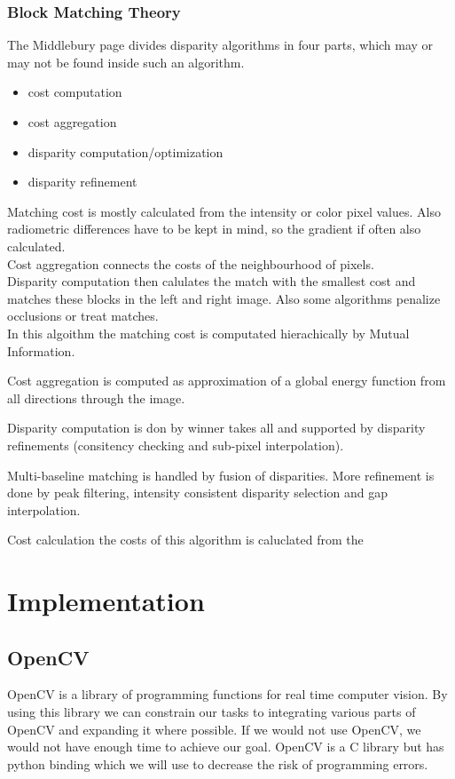 \documentclass[a4paper]{article}
\begin{document}
\subsubsection{Block Matching Theory}
\label{bm_theory}
The Middlebury page divides disparity algorithms in four parts, which
may or may not be found inside such an algorithm.
\begin{itemize}
\item cost computation
\item cost aggregation
\item disparity computation/optimization
\item disparity refinement
\end{itemize}
Matching cost is mostly calculated from the intensity or color  pixel
values. Also radiometric differences have to be kept in mind, so the
gradient if often also calculated.\\
Cost aggregation connects the costs of the neighbourhood of pixels.\\
Disparity computation then calulates the match with the smallest cost
and matches these blocks in the left and right image. Also some
algorithms penalize occlusions or treat matches.\\


In this algoithm the matching cost is computated hierachically by
Mutual Information. 

Cost aggregation is computed as approximation of a global energy
function from all directions through the image.

Disparity computation is don by winner takes all and supported by
disparity refinements (consitency checking and sub-pixel
interpolation).

Multi-baseline matching is handled by fusion of disparities.
More refinement is done by peak filtering, intensity consistent
disparity selection and gap interpolation.


Cost calculation
the costs of this algorithm is caluclated from the 

\section{Implementation}

\subsection{OpenCV}
\label{opencv} OpenCV is a library of programming functions for real
time computer vision. By using this library we can constrain our tasks
to integrating various parts of OpenCV and expanding it where
possible. If we would not use OpenCV, we would not have enough time to
achieve our goal. OpenCV is a C library but has python binding which
we will use to decrease the risk of programming errors.
\end{document}
